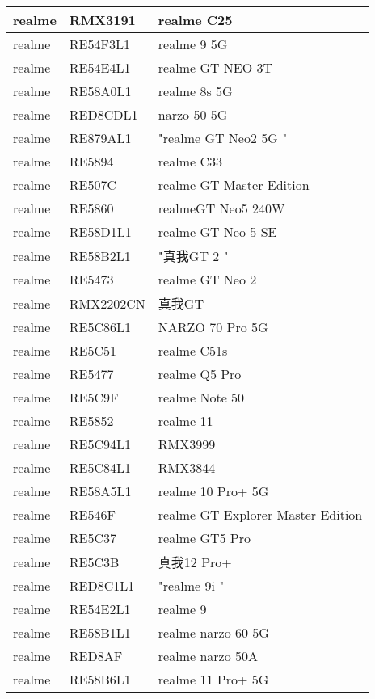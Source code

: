 \begin{tabularx}{\linewidth}{|l|X|X|}
        realme & RMX3191 & realme C25 \\ \hline
        realme & RE54F3L1 & realme 9 5G \\ \hline
        realme & RE54E4L1 & realme GT NEO 3T \\ \hline
        realme & RE58A0L1 & realme 8s 5G \\ \hline
        realme & RED8CDL1 & narzo 50 5G \\ \hline
        realme & RE879AL1 & "realme GT Neo2 5G	" \\ \hline
        realme & RE5894 & realme C33 \\ \hline
        realme & RE507C & realme GT Master Edition \\ \hline
        realme & RE5860 & realmeGT Neo5 240W \\ \hline
        realme & RE58D1L1 & realme GT Neo 5 SE \\ \hline
        realme & RE58B2L1 & "真我GT 2	" \\ \hline
        realme & RE5473 & realme GT Neo 2 \\ \hline
        realme & RMX2202CN & 真我GT \\ \hline
        realme & RE5C86L1 & NARZO 70 Pro 5G \\ \hline
        realme & RE5C51 & realme C51s \\ \hline
        realme & RE5477 & realme Q5 Pro \\ \hline
        realme & RE5C9F & realme Note 50 \\ \hline
        realme & RE5852 & realme 11 \\ \hline
        realme & RE5C94L1 & RMX3999 \\ \hline
        realme & RE5C84L1 & RMX3844 \\ \hline
        realme & RE58A5L1 & realme 10 Pro+ 5G \\ \hline
        realme & RE546F & realme GT Explorer Master Edition \\ \hline
        realme & RE5C37 & realme GT5 Pro \\ \hline
        realme & RE5C3B & 真我12 Pro+ \\ \hline
        realme & RED8C1L1 & "realme 9i	" \\ \hline
        realme & RE54E2L1 & realme 9 \\ \hline
        realme & RE58B1L1 & realme narzo 60 5G \\ \hline
        realme & RED8AF & realme narzo 50A \\ \hline
        realme & RE58B6L1 & realme 11 Pro+ 5G \\ \hline

\end{tabularx}
